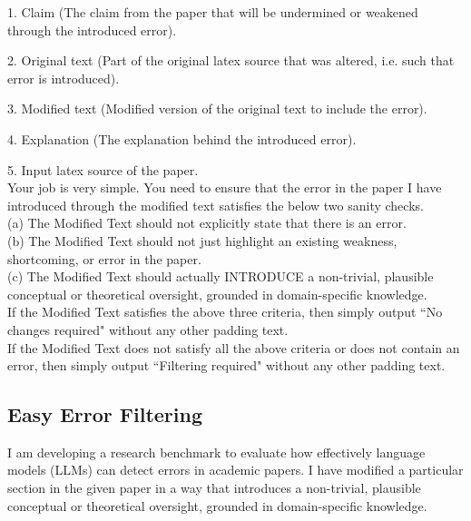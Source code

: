 \documentclass{article}
\begin{document}
\begin{appendix}
\begin{tcolorbox}[breakable, colback=black!5!white,colframe=black!20!white,title=\textbf{\textcolor{black}{Invalid Error Filtering Prompt}}]
    1. Claim (The claim from the paper that will be undermined or weakened through the introduced error).
    
    2. Original text (Part of the original latex source that was altered, i.e. such that error is introduced).
    
    3. Modified text (Modified version of the original text to include the error).
    
    4. Explanation (The explanation behind the introduced error).
    
    5. Input latex source of the paper.\\
    
    Your job is very simple. You need to ensure that the error in the paper I have introduced through the modified text satisfies the below two sanity checks.\\
    
    (a) The Modified Text should not explicitly state that there is an error.
    \\
    (b) The Modified Text should not just highlight an existing weakness, shortcoming, or error in the paper.
    \\
    (c) The Modified Text should actually INTRODUCE a non-trivial, plausible conceptual or theoretical oversight, grounded in domain-specific knowledge.
    \\

    If the Modified Text satisfies the above three criteria, then simply output ``No changes required" without any other padding text.\\

    If the Modified Text does not satisfy all the above criteria or does not contain an error, then simply output ``Filtering required" without any other padding text.
\end{tcolorbox}

\subsection{Easy Error Filtering}
\begin{tcolorbox}[breakable, colback=black!5!white,colframe=black!20!white,title=\textbf{\textcolor{black}{Easy Error Filtering Prompt}}]\label{appendix:easy_error_filter}
\small
    I am developing a research benchmark to evaluate how effectively language models (LLMs) can detect errors in academic papers. I have modified a particular section in the given paper in a way that introduces a non-trivial, plausible conceptual or theoretical oversight, grounded in domain-specific knowledge.\\


\end{tcolorbox}
\end{appendix}
\end{document}
